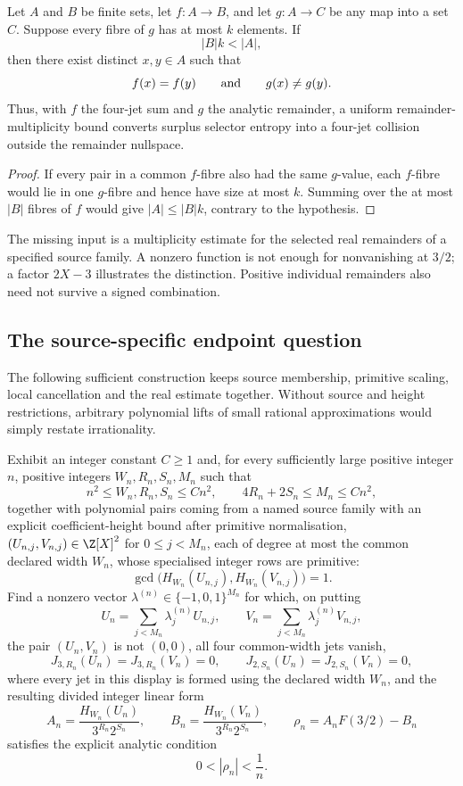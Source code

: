 \documentclass[11pt]{article}
\begin{document}
\begin{theorem}\label{res:boundedfibre}
Let $A$ and $B$ be finite sets, let $f:A\to B$, and let $g:A\to C$ be any
map into a set $C$.  Suppose every fibre of $g$ has at most $k$ elements.  If
\[
 |B|k<|A|,
\]
then there exist distinct $x,y\in A$ such that
\[
 f(x)=f(y)\qquad\hbox{and}\qquad g(x)\ne g(y).
\]
Thus, with $f$ the four-jet sum and $g$ the analytic remainder, a uniform
remainder-multiplicity bound converts surplus selector entropy into a
four-jet collision outside the remainder nullspace.
\end{theorem}

\begin{proof}
If every pair in a common $f$-fibre also had the same $g$-value, each
$f$-fibre would lie in one $g$-fibre and hence have size at most $k$.
Summing over the at most $|B|$ fibres of $f$ would give
$|A|\le |B|k$, contrary to the hypothesis.
\end{proof}

The missing input is a multiplicity estimate for the selected real
remainders of a specified source family.  A nonzero function is not enough
for nonvanishing at $3/2$; a factor $2X-3$ illustrates the distinction.
Positive individual remainders also need not survive a signed combination.

\subsection{The source-specific endpoint question}

The following sufficient construction keeps source membership, primitive
scaling, local cancellation and the real estimate together.  Without source
and height restrictions, arbitrary polynomial lifts of small rational
approximations would simply restate irrationality.

\begin{problem}\label{prob:kernel}
Exhibit an integer constant \(C\ge1\) and, for every sufficiently large
positive integer \(n\), positive integers \(W_n,R_n,S_n,M_n\) such that
\[
 n^2\le W_n,R_n,S_n\le Cn^2,
 \qquad 4R_n+2S_n\le M_n\le Cn^2,
\]
together with polynomial pairs coming from a named source family with an
explicit coefficient-height bound after primitive normalisation,
\((U_{n,j},V_{n,j})\in\Z[X]^2\) for \(0\le j<M_n\), each of degree at most
the common declared width \(W_n\), whose specialised integer rows are
primitive:
\[
 \gcd\!\bigl(H_{W_n}(U_{n,j}),H_{W_n}(V_{n,j})\bigr)=1.
\]
Find a nonzero vector
\(\lambda^{(n)}\in\{-1,0,1\}^{M_n}\) for which, on putting
\[
 U_n=\sum_{j<M_n}\lambda^{(n)}_jU_{n,j},
 \qquad V_n=\sum_{j<M_n}\lambda^{(n)}_jV_{n,j},
\]
the pair \((U_n,V_n)\) is not \((0,0)\), all four common-width jets vanish,
\[
 J_{3,R_n}(U_n)=J_{3,R_n}(V_n)=0,
 \qquad J_{2,S_n}(U_n)=J_{2,S_n}(V_n)=0,
\]
where every jet in this display is formed using the declared width \(W_n\),
and the resulting divided integer linear form
\[
 A_n=\frac{H_{W_n}(U_n)}{3^{R_n}2^{S_n}},
 \qquad
 B_n=\frac{H_{W_n}(V_n)}{3^{R_n}2^{S_n}},
 \qquad
 \rho_n=A_nF(3/2)-B_n
\]
satisfies the explicit analytic condition
\[
 0<|\rho_n|<\frac1n.
\]
\end{problem}
\end{document}
